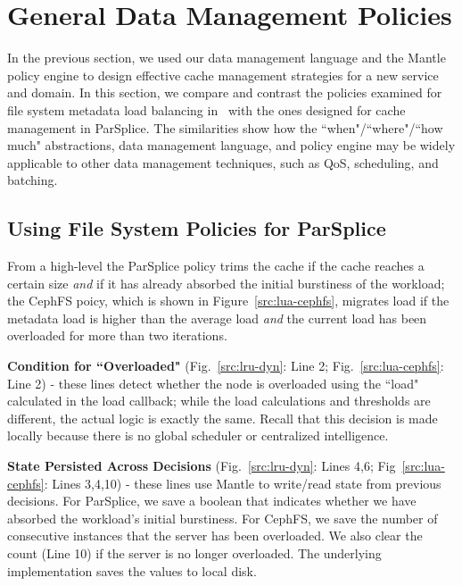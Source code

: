 \section{General Data Management Policies}
\label{sec:relation-to-load-balancing}


In the previous section, we used our data management language and the Mantle
policy engine to design effective cache management strategies for a new service
and domain. In this section, we compare and contrast the policies examined for
file system metadata load balancing in~\cite{sevilla:sc15-mantle} with the ones
designed for cache management in ParSplice. The similarities show how the
``when"/``where"/``how much" abstractions, data management language, and policy
engine may be widely applicable to other data management techniques, such as
QoS, scheduling, and batching.

\subsection{Using File System Policies for ParSplice}
From a high-level the ParSplice policy trims the cache if the cache reaches a
certain size {\it and} if it has already absorbed the initial burstiness of the
workload; the CephFS poicy, which is shown in Figure~\ref{src:lua-cephfs},
migrates load if the metadata load is higher than the average load {\it and}
the current load has been overloaded for more than two iterations.

\textbf{Condition for ``Overloaded"} (Fig.~\ref{src:lru-dyn}: Line 2;
Fig.~\ref{src:lua-cephfs}: Line 2) - these lines detect whether the node is
overloaded using the ``load" calculated in the load callback; while the load
calculations and thresholds are different, the actual logic is exactly the
same.  Recall that this decision is made locally because there is no global
scheduler or centralized intelligence. 

\textbf{State Persisted Across Decisions} (Fig.~\ref{src:lru-dyn}: Lines 4,6;
Fig~\ref{src:lua-cephfs}: Lines 3,4,10) - these lines use Mantle to write/read state
from previous decisions.  For ParSplice, we save a boolean that indicates
whether we have absorbed the workload's initial burstiness. For CephFS, we save
the number of consecutive instances that the server has been overloaded. We
also clear the count (Line 10) if the server is no longer overloaded. The
underlying implementation saves the values to local disk.

